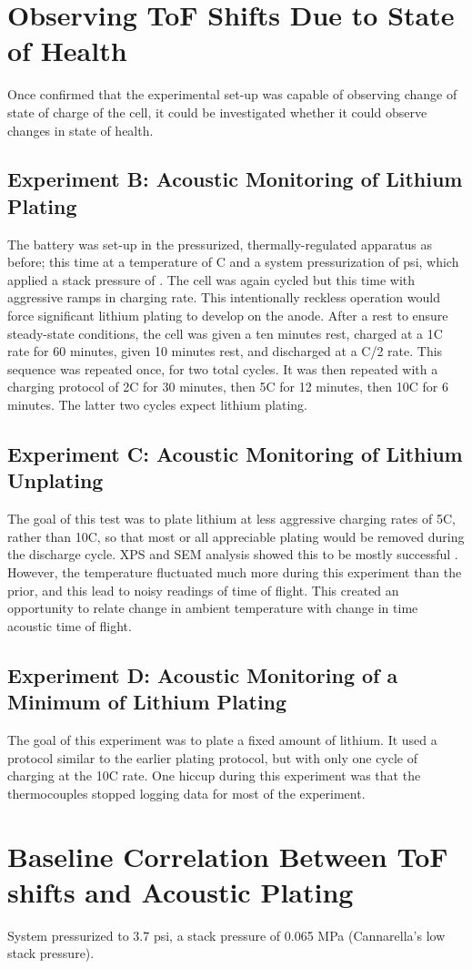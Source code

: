 \section{Observing ToF Shifts Due to State of Health} 
Once confirmed that the experimental set-up was capable of observing change of state of charge of the cell, it could be investigated whether it could observe changes in state of health.

\subsection{Experiment B: Acoustic Monitoring of Lithium Plating}
The battery was set-up in the pressurized, thermally-regulated apparatus as before; this time at a temperature of  C and a system pressurization of  psi, which applied a stack pressure of . 
The cell was again cycled but this time with aggressive ramps in charging rate. 
This intentionally reckless operation would force significant lithium plating to develop on the anode. 
After a rest to ensure steady-state conditions, the cell was given a ten minutes rest, charged at a 1C rate for 60 minutes, given 10 minutes rest, and discharged at a C/2 rate. 
This sequence was repeated once, for two total cycles. 
It was then repeated with a charging protocol of 2C for 30 minutes, then 5C for 12 minutes, then 10C for 6 minutes. 
The latter two cycles expect lithium plating.


\subsection{Experiment C: Acoustic Monitoring of Lithium Unplating}
The goal of this test was to plate lithium at less aggressive charging rates of 5C, rather than 10C, so that most or all appreciable plating would be removed during the discharge cycle. XPS and SEM analysis showed this to be mostly successful . However, the temperature fluctuated much more during this experiment than the prior, and this lead to noisy readings of time of flight. This created an opportunity to relate change in ambient temperature with change in time acoustic time of flight. 


\subsection{Experiment D: Acoustic Monitoring of a Minimum of Lithium Plating}
The goal of this experiment was to plate a fixed amount of lithium. It used a protocol similar to the earlier plating protocol, but with only one cycle of charging at the 10C rate. One hiccup during this experiment was that the thermocouples stopped logging data for most of the experiment. 


\section{Baseline Correlation Between ToF shifts and Acoustic Plating}
System pressurized to 3.7 psi, a stack pressure of 0.065 MPa (Cannarella's low stack pressure).